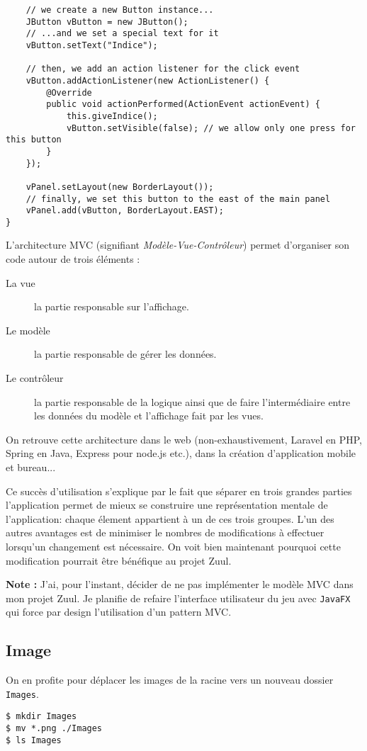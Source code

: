 \begin{exercise}[subtitle=getCommandList]
\begin{verbatim}
    // we create a new Button instance...
    JButton vButton = new JButton();
    // ...and we set a special text for it
    vButton.setText("Indice");
    
    // then, we add an action listener for the click event
    vButton.addActionListener(new ActionListener() {
        @Override
        public void actionPerformed(ActionEvent actionEvent) {
            this.giveIndice();
            vButton.setVisible(false); // we allow only one press for this button
        }
    });

    vPanel.setLayout(new BorderLayout());
    // finally, we set this button to the east of the main panel
    vPanel.add(vButton, BorderLayout.EAST);
}
\end{verbatim}
\end{exercise}

\begin{exercise}[subtitle=Modèle Vue Contrôleur]

L'architecture MVC (signifiant \emph{Modèle-Vue-Contrôleur}) permet d'organiser son code autour de trois éléments :

\begin{description} 
  \item[La vue] la partie responsable sur l'affichage.
  \item[Le modèle] la partie responsable de gérer les données.
  \item[Le contrôleur] la partie responsable de la logique ainsi que de faire l'intermédiaire entre les données du modèle et l'affichage fait par les vues.
\end{description}

On retrouve cette architecture dans le web (non-exhaustivement, Laravel en PHP, Spring en Java, Express pour node.js etc.), dans la création d'application mobile et bureau...

Ce succès d'utilisation s'explique par le fait que séparer en trois grandes parties l'application permet de mieux se construire une représentation mentale de l'application: chaque élement appartient à un de ces trois groupes. L'un des autres avantages est de minimiser le nombres de modifications à effectuer lorsqu'un changement est nécessaire. On voit bien maintenant pourquoi cette modification pourrait être bénéfique au projet Zuul.

\textbf{Note :} J'ai, pour l'instant, décider de ne pas implémenter le modèle MVC dans mon projet Zuul. Je planifie de refaire l'interface utilisateur du jeu avec \verb|JavaFX| qui force par design l'utilisation d'un pattern MVC.

\subsection*{Image}

On en profite pour déplacer les images de la racine vers un nouveau dossier \verb|Images|.

\begin{verbatim}
$ mkdir Images
$ mv *.png ./Images
$ ls Images
\end{verbatim}
\end{exercise}

